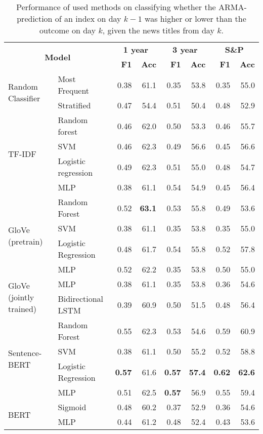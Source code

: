 \begin{table}[H]
    \centering
    \begin{tabular}{llrrrrrr}
    \hline
        \multicolumn{2}{c}{\multirow{2}{*}{\textbf{Model}}} & \multicolumn{2}{c}{\textbf{1 year}} & \multicolumn{2}{c}{\textbf{3 year}} & \multicolumn{2}{c}{\textbf{S\&P}} \\
      & & \textbf{F1} & \textbf{Acc} & \textbf{F1} & \textbf{Acc} & \textbf{F1} & \textbf{Acc} \\
        \hline \hline   
        \multirow{2}{*}{Random Classifier} & Most Frequent & 0.38 & 61.1 & 0.35 & 53.8 & 0.35 & 55.0  \\
        & Stratified & 0.47 & 54.4 & 0.51 & 50.4 & 0.48 & 52.9  \\
        \hline 
        \multirow{4}{*}{TF-IDF} & Random forest & 0.46 & 62.0 & 0.50 & 53.3 & 0.46 & 55.7  \\
        & SVM & 0.46 & 62.3 & 0.49 & 56.6 & 0.45 & 56.6 \\
        & Logistic regression & 0.49 & 62.3 & 0.51 & 55.0 & 0.48 & 54.7 \\
        & MLP & 0.38 & 61.1 &  0.54 & 54.9 & 0.45 & 56.4 \\
        \hline 
        \multirow{4}{*}{GloVe (pretrain)} & Random Forest & 0.52 & \textbf{63.1} & 0.53 & 55.8 & 0.49 & 53.6
        \\
        & SVM & 0.38 & 61.1 & 0.35 & 53.8 & 0.35 & 55.0 
        \\
        & Logistic Regression & 0.48 & 61.7 & 0.54 & 55.8 & 0.52 & 57.8
        \\
        & MLP & 0.52 & 62.2 & 0.35 & 53.8 & 0.50 & 55.0 \\
        \hline 
        \multirow{2}{*}{GloVe (jointly trained)} & MLP & 0.38 & 61.1 & 0.35 & 53.8 & 0.36 & 54.6 \\
        & Bidirectional LSTM & 0.39 & 60.9 & 0.50 & 51.5 & 0.48 & 56.4 \\
        \hline 
        \multirow{4}{*}{Sentence-BERT} & Random Forest & 0.55 & 62.3 & 0.53 & 54.6 & 0.59 & 60.9 \\
        & SVM & 0.38 & 61.1 & 0.50 & 55.2 & 0.52 & 58.8 \\
        & Logistic Regression & \textbf{0.57} & 61.6 & \textbf{0.57} & \textbf{57.4} & \textbf{0.62} & \textbf{62.6}   \\
        & MLP & 0.51 & 62.5 & \textbf{0.57} & 56.9 & 0.55 & 59.4 \\
        \hline
        \multirow{2}{*}{BERT} & Sigmoid & 0.48 & 60.2 & 0.37 & 52.9 & 0.36 & 54.6 \\
        & MLP & 0.44 & 61.2 & 0.48 & 52.4 & 0.43 & 53.6 \\
        \hline
    \end{tabular}
\caption{Performance of used methods on classifying whether the ARMA-prediction of an index on day $k-1$ was higher or lower than the outcome on day $k$, given the news titles from day $k$.}
\label{tab:res_arma_cdp}
\end{table}

